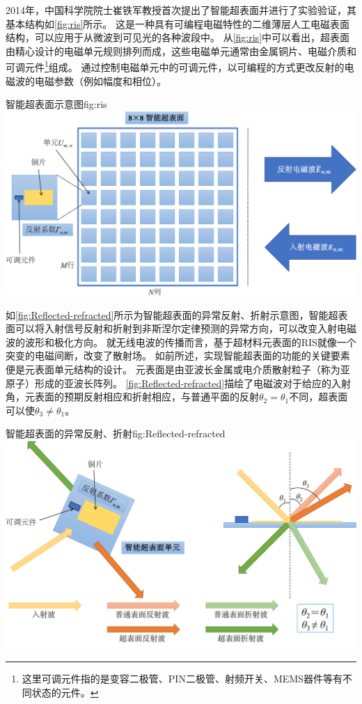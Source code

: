 \documentclass[supercite]{HustGraduPaper}
\begin{document}
2014年，中国科学院院士崔铁军教授首次提出了智能超表面并进行了实验验证，其基本结构如\autoref{fig:ris}所示\cite{cui2014coding}。
这是一种具有可编程电磁特性的二维薄层人工电磁表面结构，可以应用于从微波到可见光的各种波段中\cite{CHN_zhang2017}。
从\autoref{fig:ris}中可以看出，超表面由精心设计的电磁单元规则排列而成，这些电磁单元通常由金属铜片、电磁介质和可调元件\footnote{这里可调元件指的是变容二极管、PIN二极管、射频开关、MEMS器件等有不同状态的元件。}组成。
通过控制电磁单元中的可调元件，以可编程的方式更改反射的电磁波的电磁参数（例如幅度和相位）\cite{CHN_zhou2020}。

\begin{generalfig}[htb]{智能超表面示意图}{fig:ris}
	\includegraphics[width=0.8\linewidth]{Figures/ris.pdf}
\end{generalfig}

如\autoref{fig:Reflected-refracted}所示为智能超表面的异常反射、折射示意图，智能超表面可以将入射信号反射和折射到非斯涅尔定律预测的异常方向，可以改变入射电磁波的波形和极化方向\cite{Renzo2019}。
就无线电波的传播而言，基于超材料元表面的RIS就像一个突变的电磁间断，改变了散射场。
如前所述，实现智能超表面的功能的关键要素便是元表面单元结构的设计\cite{5502350, liang2019large}。
元表面是由亚波长金属或电介质散射粒子（称为亚原子）形成的亚波长阵列\cite{basar2019wireless}。
\autoref{fig:Reflected-refracted}描绘了电磁波对于给应的入射角，元表面的预期反射相应和折射相应，与普通平面的反射$ \theta_2 =  \theta_1 $不同，超表面可以使$ \theta_3 \ne \theta_1 $。

\begin{generalfig}[htb]{智能超表面的异常反射、折射}{fig:Reflected-refracted}
	\includegraphics[width=0.8\linewidth]{Figures/Reflected-refracted.pdf}
\end{generalfig}
\end{document}

